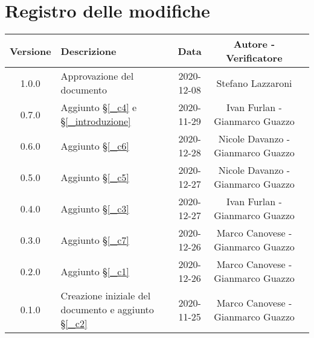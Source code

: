 \section*{Registro delle modifiche}

\begin{center}
	\begin{longtable}{|c|p{5cm}|c|c|c|}
	\hline
	\rowcolor{lighter-grayer}
	\textbf{Versione} & \textbf{Descrizione} & \textbf{Data} & \textbf{Autore - Verificatore}\\
	\hline
	\endfirsthead

	\hline
	1.0.0 & Approvazione del documento & 2020-12-08 & Stefano Lazzaroni\\
	0.7.0 & Aggiunto \S\ref{_c4} e \S\ref{_introduzione} & 2020-11-29 & Ivan Furlan - Gianmarco Guazzo\\
	0.6.0 & Aggiunto \S\ref{_c6} & 2020-12-28 & Nicole Davanzo - Gianmarco Guazzo\\
	0.5.0 & Aggiunto \S\ref{_c5} & 2020-12-27 & Nicole Davanzo - Gianmarco Guazzo\\
	0.4.0 & Aggiunto \S\ref{_c3} & 2020-12-27 & Ivan Furlan - Gianmarco Guazzo\\
	0.3.0 & Aggiunto \S\ref{_c7} & 2020-12-26 & Marco Canovese - Gianmarco Guazzo\\
	0.2.0 & Aggiunto \S\ref{_c1} & 2020-12-26 & Marco Canovese - Gianmarco Guazzo\\
    0.1.0 & Creazione iniziale del documento e aggiunto \S\ref{_c2} & 2020-11-25 & Marco Canovese - Gianmarco Guazzo\\
	\hline

	\end{longtable}
\end{center}
